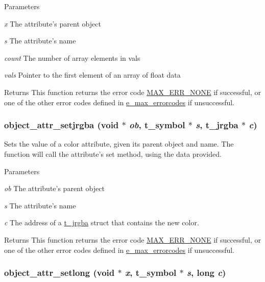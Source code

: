 \begin{DoxyParams}{Parameters}
\item[{\em x}]The attribute's parent object \item[{\em s}]The attribute's name \item[{\em count}]The number of array elements in vals \item[{\em vals}]Pointer to the first element of an array of float data\end{DoxyParams}
\begin{DoxyReturn}{Returns}
This function returns the error code \hyperlink{group__misc_gga0764dd6c02b76cca7d053ae50555d69da6d22f77fef8b1e1b074cef5d29d935fd}{MAX\_\-ERR\_\-NONE} if successful, or one of the other error codes defined in \hyperlink{group__misc_ga0764dd6c02b76cca7d053ae50555d69d}{e\_\-max\_\-errorcodes} if unsuccessful. 
\end{DoxyReturn}
\hypertarget{group__attr_ga507467c980edfa3c300e0f085e6d9f11}{
\subsubsection[{object\_\-attr\_\-setjrgba}]{ object\_\-attr\_\-setjrgba (void $\ast$ {\em ob}, \/  {\bf t\_\-symbol} $\ast$ {\em s}, \/  {\bf t\_\-jrgba} $\ast$ {\em c})}}
\label{group__attr_ga507467c980edfa3c300e0f085e6d9f11}


Sets the value of a color attribute, given its parent object and name. The function will call the attribute's {\ttfamily set} method, using the data provided.


\begin{DoxyParams}{Parameters}
\item[{\em ob}]The attribute's parent object \item[{\em s}]The attribute's name \item[{\em c}]The address of a \hyperlink{structt__jrgba}{t\_\-jrgba} struct that contains the new color. \end{DoxyParams}
\begin{DoxyReturn}{Returns}
This function returns the error code \hyperlink{group__misc_gga0764dd6c02b76cca7d053ae50555d69da6d22f77fef8b1e1b074cef5d29d935fd}{MAX\_\-ERR\_\-NONE} if successful, or one of the other error codes defined in \hyperlink{group__misc_ga0764dd6c02b76cca7d053ae50555d69d}{e\_\-max\_\-errorcodes} if unsuccessful. 
\end{DoxyReturn}
\hypertarget{group__attr_ga986dd931f91666f178bdf3aace48f53b}{
\subsubsection[{object\_\-attr\_\-setlong}]{ object\_\-attr\_\-setlong (void $\ast$ {\em x}, \/  {\bf t\_\-symbol} $\ast$ {\em s}, \/  long {\em c})}}
\label{group__attr_ga986dd931f91666f178bdf3aace48f53b}


